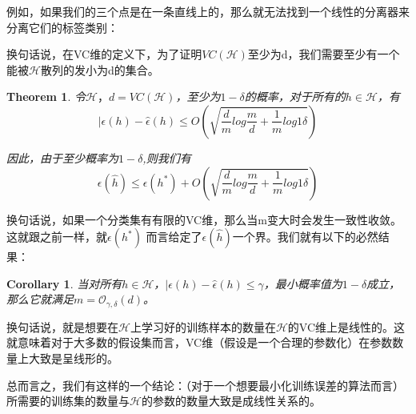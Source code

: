 \documentclass[UTF8]{ctexart}
\begin{document}
例如，如果我们的三个点是在一条直线上的，那么就无法找到一个线性的分离器来分离它们的标签类别：

\begin{figure}[htb]        
\end{figure}

换句话说，在VC维的定义下，为了证明$VC(\mathcal{H})$至少为d，我们需要至少有一个能被$\mathcal{H}$散列的发小为d的集合。

\newtheorem{law5}{Theorem}[section]
\begin{law5} \label{law:box}
令$\mathcal{H}，d=VC(\mathcal{H})$，至少为$1-\delta$的概率，对于所有的$h \in \mathcal{H}$，有\[ |\epsilon(h)-\hat{\epsilon}(h) \leq O (\sqrt{\frac{d}{m} log\frac{m}{d}+\frac{1}{m}log{1}{\delta}}) \]

因此，由于至少概率为$1-\delta$,则我们有\[ \epsilon(\hat{h}) \leq \epsilon(h^{*}) + O (\sqrt{\frac{d}{m} log\frac{m}{d}+\frac{1}{m}log{1}{\delta}}) \]
\end{law5}

换句话说，如果一个分类集有有限的VC维，那么当m变大时会发生一致性收敛。这就跟之前一样，就$\epsilon(h^{*})$ 而言给定了$\epsilon(\hat{h}) $一个界。我们就有以下的必然结果：


\newtheorem{law6}{Corollary}[section]
\begin{law6} \label{law:box}
当对所有$h \in \mathcal{H}$，$|\epsilon(h)-\hat{\epsilon}(h) \leq \gamma$，最小概率值为$1-\delta$成立，那么它就满足$m=\mathcal{O}_{\gamma,\delta}(d)$。
\end{law6}

换句话说，就是想要在$\mathcal{H}$上学习好的训练样本的数量在$\mathcal{H}$的VC维上是线性的。这就意味着对于大多数的假设集而言，VC维（假设是一个合理的参数化）在参数数量上大致是呈线形的。


总而言之，我们有这样的一个结论：（对于一个想要最小化训练误差的算法而言）所需要的训练集的数量与$\mathcal{H}$的参数的数量大致是成线性关系的。
\end{document}
